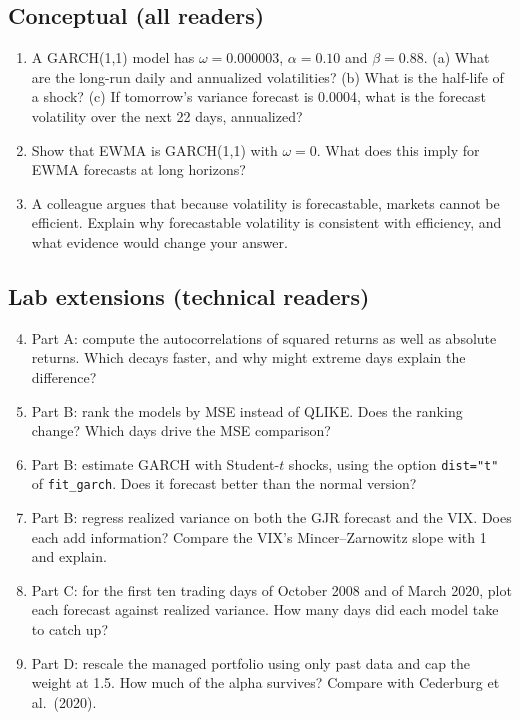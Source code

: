 \subsection*{Conceptual (all readers)}

\begin{enumerate}
  \item A GARCH(1,1) model has $\omega = 0.000003$, $\alpha = 0.10$ and $\beta = 0.88$. (a) What are the long-run daily and annualized volatilities? (b) What is the half-life of a shock? (c) If tomorrow's variance forecast is 0.0004, what is the forecast volatility over the next 22 days, annualized?
  \item Show that EWMA is GARCH(1,1) with $\omega = 0$. What does this imply for EWMA forecasts at long horizons?
  \item A colleague argues that because volatility is forecastable, markets cannot be efficient. Explain why forecastable volatility is consistent with efficiency, and what evidence would change your answer.
\end{enumerate}

\subsection*{Lab extensions (technical readers)}

\begin{enumerate}
  \setcounter{enumi}{3}
  \item Part A: compute the autocorrelations of squared returns as well as absolute returns. Which decays faster, and why might extreme days explain the difference?
  \item Part B: rank the models by MSE instead of QLIKE. Does the ranking change? Which days drive the MSE comparison?
  \item Part B: estimate GARCH with Student-$t$ shocks, using the option \texttt{dist="t"} of \texttt{fit\_garch}. Does it forecast better than the normal version?
  \item Part B: regress realized variance on both the GJR forecast and the VIX. Does each add information? Compare the VIX's Mincer--Zarnowitz slope with 1 and explain.
  \item Part C: for the first ten trading days of October 2008 and of March 2020, plot each forecast against realized variance. How many days did each model take to catch up?
  \item Part D: rescale the managed portfolio using only past data and cap the weight at 1.5. How much of the alpha survives? Compare with Cederburg et al.\ (2020).
\end{enumerate}


